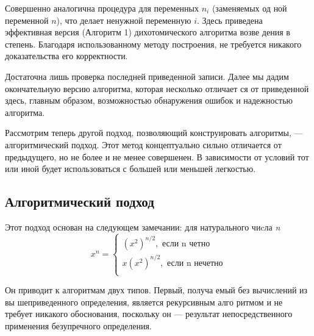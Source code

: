 Совершенно аналогична процедура для переменных \textit{$n_{i}$} (заменяемых од­
ной переменной \textit{$n$}), что делает ненужной переменную \textit{$i$}. Здесь приведена
эффективная версия (Алгоритм 1) дихотомического алгоритма возве­
дения в степень. Благодаря использованному методу построения, не
требуется никакого доказательства его корректности.

Достаточна лишь проверка последней приведенной записи. Далее мы
дадим окончательную версию алгоритма, которая несколько отличает­
ся от приведенной здесь, главным образом, возможностью обнаружения
ошибок и надежностью алгоритма.

Рассмотрим теперь другой подход, позволяющий конструировать
алгоритмы, — алгоритмический подход. Этот метод концептуально
сильно отличается от предыдущего, но не более и не менее совершенен.
В зависимости от условий тот или иной будет использоваться с большей
или меньшей легкостью.
\subsection{ Алгоритмический подход}
\noindent Этот подход основан на следующем замечании: для натурального чиcла \textit{n}
\begin{equation*}
 x^n = 
 \begin{cases}
   (x^{2})^{n/2}, \text{ если n четно}
   \\
   x(x^{2})^{n/2}, \text{ если n нечетно}
   \\
 \end{cases}
\end{equation*}

\pagebreak
{}
\noindent Он приводит к алгоритмам
двух типов. Первый, получа­
емый без вычислений из вы­
шеприведенного определения,
является рекурсивным алго­
ритмом и не требует никакого
обоснования, поскольку он —
результат непосредственного
применения безупречного определения.

